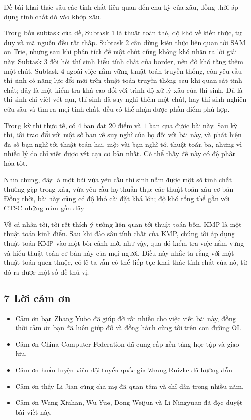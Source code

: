 \documentclass[11pt]{article}
\begin{document}
Đề bài khai thác sâu các tính chất liên quan đến chu kỳ của xâu, đồng thời áp
dụng tính chất đó vào khớp xâu.

Trong bốn subtask của đề, Subtask 1 là thuật toán thô, độ khó về kiến thức, tư
duy và mã nguồn đều rất thấp. Subtask 2 cần dùng kiến thức liên quan tới SAM on
Trie, nhưng sau khi phân tích đề một chút cũng không khó nhận ra lời giải này.
Subtask 3 đòi hỏi thí sinh hiểu tính chất của border, nên độ khó tăng thêm một
chút. Subtask 4 ngoài việc nắm vững thuật toán truyền thống, còn yêu cầu thí
sinh có năng lực đổi mới trên thuật toán truyền thống sau khi quan sát tính
chất; đây là một kiểm tra khá cao đối với trình độ xử lý xâu của thí sinh. Dù
là thí sinh chỉ viết vét cạn, thí sinh đã suy nghĩ thêm một chút, hay thí sinh
nghiên cứu sâu và tìm ra mọi tính chất, đều có thể nhận được phần điểm phù hợp.

Trong kỳ thi thực tế, có \(4\) bạn đạt \(20\) điểm và \(1\) bạn qua được bài
này. Sau kỳ thi, tôi trao đổi với một số bạn về suy nghĩ của họ đối với bài
này, và phát hiện đa số bạn nghĩ tới thuật toán hai, một vài bạn nghĩ tới thuật
toán ba, nhưng vì nhiều lý do chỉ viết được vét cạn cơ bản nhất. Có thể thấy đề
này có độ phân hóa tốt.

Nhìn chung, đây là một bài vừa yêu cầu thí sinh nắm được một số tính chất
thường gặp trong xâu, vừa yêu cầu họ thuần thục các thuật toán xâu cơ bản. Đồng
thời, bài này cũng có độ khó cài đặt khá lớn; độ khó tổng thể gần với CTSC
những năm gần đây.

Về cá nhân tôi, tôi rất thích ý tưởng liên quan tới thuật toán bốn. KMP là một
thuật toán kinh điển. Sau khi đào sâu tính chất của KMP, chúng tôi áp dụng
thuật toán KMP vào một bối cảnh mới như vậy, qua đó kiểm tra việc nắm vững và
hiểu thuật toán cơ bản này của mọi người. Điều này nhắc ta rằng với một thuật
toán quen thuộc, có lẽ ta vẫn có thể tiếp tục khai thác tính chất của nó, từ đó
ra được một số đề thú vị.

\subsection*{7 Lời cảm ơn}

\begin{itemize}
  \item Cảm ơn bạn Zhang Yubo đã giúp đỡ rất nhiều cho việc viết bài này, đồng
  thời cảm ơn bạn đã luôn giúp đỡ và đồng hành cùng tôi trên con đường OI.
  \item Cảm ơn China Computer Federation đã cung cấp nền tảng học tập và giao
  lưu.
  \item Cảm ơn huấn luyện viên đội tuyển quốc gia Zhang Ruizhe đã hướng dẫn.
  \item Cảm ơn thầy Li Jian cùng cha mẹ đã quan tâm và chỉ dẫn trong nhiều năm.
  \item Cảm ơn Wang Xiuhan, Wu Yue, Dong Weijun và Li Ningyuan đã đọc duyệt bài
  viết này.
\end{itemize}
\end{document}
